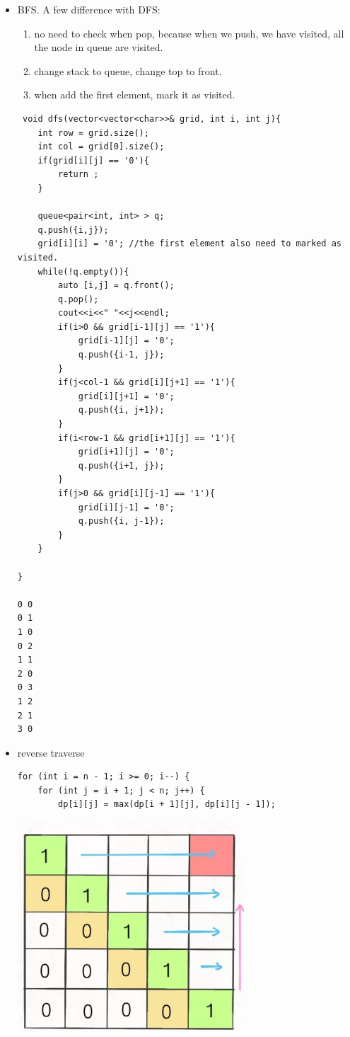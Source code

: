 \documentclass[a4paper,11pt,twoside]{book}
\begin{document}
\begin{itemize}
	\item BFS. A few difference with DFS:
\begin{enumerate}
	\item no need to check when pop, because when we push, we have visited, all the node in queue are visited. 
	
	\item change stack to queue, change top to front.
	
	\item when add the first element, mark it as visited.  
\end{enumerate}
	 
\begin{lstlisting}
 void dfs(vector<vector<char>>& grid, int i, int j){
	int row = grid.size();
	int col = grid[0].size();
	if(grid[i][j] == '0'){
		return ;
	}
	
	queue<pair<int, int> > q;
	q.push({i,j});
	grid[i][i] = '0'; //the first element also need to marked as visited. 
	while(!q.empty()){
		auto [i,j] = q.front();
		q.pop();
		cout<<i<<" "<<j<<endl;
		if(i>0 && grid[i-1][j] == '1'){
			grid[i-1][j] = '0';
			q.push({i-1, j});
		}
		if(j<col-1 && grid[i][j+1] == '1'){
			grid[i][j+1] = '0';
			q.push({i, j+1});
		}
		if(i<row-1 && grid[i+1][j] == '1'){
			grid[i+1][j] = '0';
			q.push({i+1, j});
		}
		if(j>0 && grid[i][j-1] == '1'){
			grid[i][j-1] = '0';
			q.push({i, j-1});
		}      
	}
	
}

0 0
0 1
1 0
0 2
1 1
2 0
0 3
1 2
2 1
3 0
\end{lstlisting}


	\item  reverse traverse
\begin{lstlisting}
for (int i = n - 1; i >= 0; i--) {
	for (int j = i + 1; j < n; j++) {
		dp[i][j] = max(dp[i + 1][j], dp[i][j - 1]);	
\end{lstlisting}

\begin{center}
	\includegraphics[scale=0.60]{pics/mr.png}
\end{center}


\end{itemize}
\end{document}
